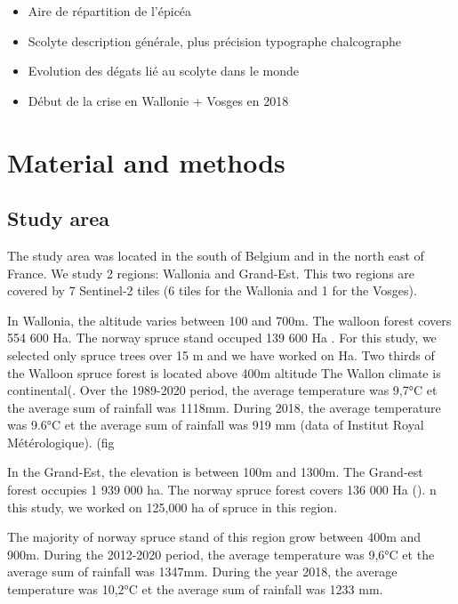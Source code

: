 \documentclass[3p,times]{elsarticle}
\begin{document}
\begin{itemize}
	\item Aire de répartition de l'épicéa
	\item Scolyte description générale, plus précision typographe chalcographe
	\item Evolution des dégats lié au scolyte dans le monde
	\item Début de la crise en Wallonie + Vosges en 2018
\end{itemize}

\section{Material and methods}
\subsection{Study area}
The study area was located in the south of Belgium and in the north east of France. We study 2 regions: Wallonia and Grand-Est.
This two regions are covered by 7 Sentinel-2 tiles (6 tiles for the Wallonia and 1 for the Vosges).

In Wallonia, the altitude varies between 100 and 700m. The walloon forest covers 554 600 Ha. The norway spruce stand occuped 139 600 Ha \citep{Alderweireld_2015}. For this study, we selected only spruce trees over 15 m and we have worked on %
Ha. Two thirds of the Walloon spruce forest is located above 400m altitude
The Wallon climate is continental(\citep{Metzger_2005}. %
Over the 1989-2020 period, the average temperature was 9,7°C et the average sum of rainfall was 1118mm. During 2018, the average temperature was 9.6°C et the average sum of rainfall was 919 mm (data of Institut Royal Métérologique). (fig %

In the Grand-Est, the elevation is between 100m and 1300m. The Grand-est forest occupies 1 939 000 ha. The norway spruce forest covers 136 000 Ha (\citep{francais_donnees_2022}).
n this study, we worked on 125,000 ha of spruce in this region.

The majority of norway spruce stand of this region grow between 400m and 900m.
During the 2012-2020 period, the average temperature was 9,6°C et the average sum of rainfall was 1347mm. During the year 2018, the average temperature was 10,2°C et the average sum of rainfall was 1233 mm.
\end{document}
